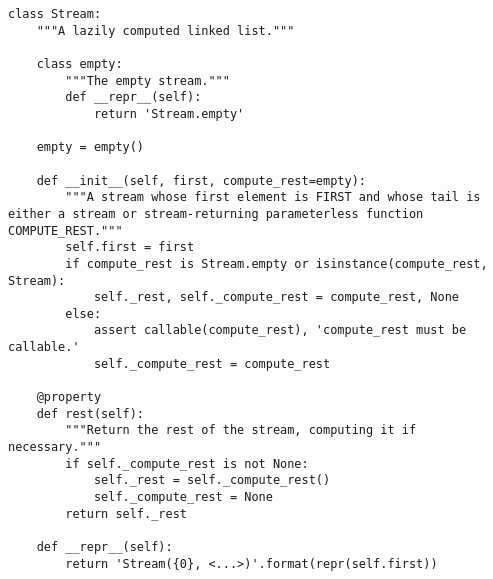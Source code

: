 \begin{lstlisting}
class Stream:
    """A lazily computed linked list."""

    class empty:
        """The empty stream."""
        def __repr__(self):
            return 'Stream.empty'

    empty = empty()

    def __init__(self, first, compute_rest=empty):
        """A stream whose first element is FIRST and whose tail is either a stream or stream-returning parameterless function COMPUTE_REST."""
        self.first = first
        if compute_rest is Stream.empty or isinstance(compute_rest, Stream):
            self._rest, self._compute_rest = compute_rest, None
        else:
            assert callable(compute_rest), 'compute_rest must be callable.'
            self._compute_rest = compute_rest

    @property
    def rest(self):
        """Return the rest of the stream, computing it if necessary."""
        if self._compute_rest is not None:
            self._rest = self._compute_rest()
            self._compute_rest = None
        return self._rest

    def __repr__(self):
        return 'Stream({0}, <...>)'.format(repr(self.first))
\end{lstlisting}
